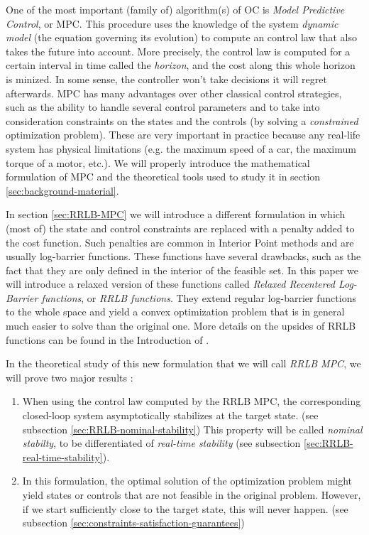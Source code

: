 \documentclass[12pt]{article}
\begin{document}
One of the most important (family of) algorithm(s) of OC is \textit{Model Predictive Control}, or MPC. 
This procedure uses the knowledge of the system \textit{dynamic model} (the equation governing its evolution) to compute an control law that also takes the future into account.
More precisely, the control law is computed for a certain interval in time called the \textit{horizon}, and the cost along this whole horizon is minized.
In some sense, the controller won't take decisions it will regret afterwards.
MPC has many advantages over other classical control strategies, such as the ability to handle several control parameters and to take into consideration constraints on the states and the controls (by solving a \textit{constrained} optimization problem). These are very important in practice because any real-life system has physical limitations (e.g. the maximum speed of a car, the maximum torque of a motor, etc.).
We will properly introduce the mathematical formulation of MPC and the theoretical tools used to study it in section \ref{sec:background-material}.

In section \ref{sec:RRLB-MPC} we will introduce a different formulation in which (most of) the state and control constraints are replaced with a penalty added to the cost function.
Such penalties are common in Interior Point methods and are usually log-barrier functions.
These functions have several drawbacks, such as the fact that they are only defined in the interior of the feasible set.
In this paper we will introduce a relaxed version of these functions called \textit{Relaxed Recentered Log-Barrier functions}, or \textit{RRLB functions}. 
They extend regular log-barrier functions to the whole space and yield a convex optimization problem that is in general much easier to solve than the original one.
More details on the upsides of RRLB functions can be found in the Introduction of \cite{RRLB-linear-MPC}.

In the theoretical study of this new formulation that we will call \textit{RRLB MPC}, we will prove two major results : 
\begin{enumerate}
	\item When using the control law computed by the RRLB MPC, the corresponding closed-loop system asymptotically stabilizes at the target state. (see subsection \ref{sec:RRLB-nominal-stability}) This property will be called \textit{nominal stabilty}, to be differentiated of \textit{real-time stability} (see subsection \ref{sec:RRLB-real-time-stability}).
	\item In this formulation, the optimal solution of the optimization problem might yield states or controls that are not feasible in the original problem. However, if we start sufficiently close to the target state, this will never happen. (see subsection \ref{sec:constraints-satisfaction-guarantees})
\end{enumerate}
\end{document}
